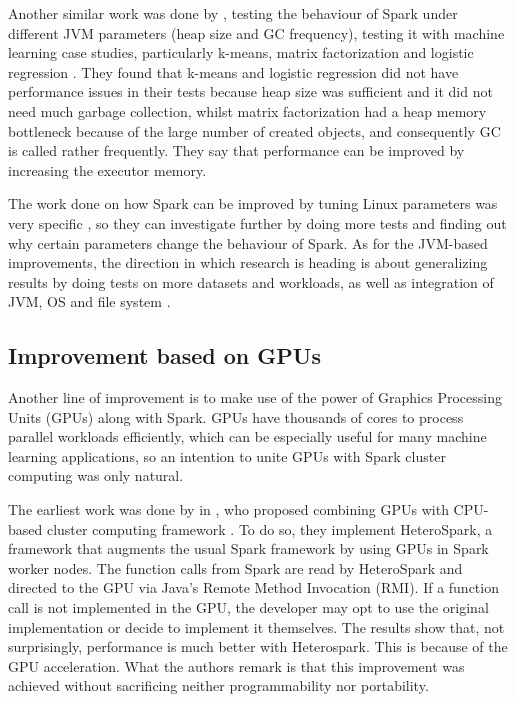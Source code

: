 \documentclass{article}
\begin{document}
Another similar work was done by \citeauthor{Hema2016}, testing the behaviour of Spark under different JVM parameters (heap size and GC frequency), testing it with machine learning case studies, particularly k-means, matrix factorization and logistic regression \cite{Hema2016}. They found that k-means and logistic regression did not have performance issues in their tests because heap size was sufficient and it did not need much garbage collection, whilst matrix factorization had a heap memory bottleneck because of the large number of created objects, and consequently GC is called rather frequently. They say that performance can be improved by increasing the executor memory.

The work done on how Spark can be improved by tuning Linux parameters was very specific \cite{Wang2016}, so they can investigate further by doing more tests and finding out why certain parameters change the behaviour of Spark. As for the JVM-based improvements, the direction in which research is heading is about generalizing results by doing tests on more datasets and workloads, as well as integration of JVM, OS and file system \cite{Chiba2016} \cite{Hema2016}.

\subsection{Improvement based on GPUs}

Another line of improvement is to make use of the power of Graphics Processing Units (GPUs) along with Spark. GPUs have thousands of cores to process parallel workloads efficiently, which can be especially useful for many machine learning applications, so an intention to unite GPUs with Spark cluster computing was only natural.

The earliest work was done by \citeauthor{Li2015} in \citeyear{Li2015}, who proposed combining GPUs with CPU-based cluster computing framework \cite{Li2015}. To do so, they implement HeteroSpark, a framework that augments the usual Spark framework by using GPUs in Spark worker nodes. The function calls from Spark are read by HeteroSpark and directed to the GPU via Java's Remote Method Invocation (RMI). If a function call is not implemented in the GPU, the developer may opt to use the original implementation or decide to implement it themselves. The results show that, not surprisingly, performance is much better with Heterospark. This is because of the GPU acceleration. What the authors remark is that this improvement was achieved without sacrificing neither programmability nor portability.
\end{document}
